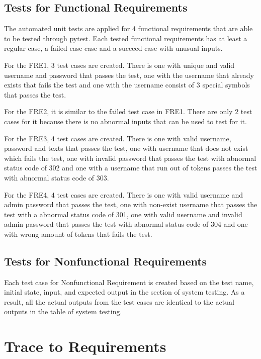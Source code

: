 \documentclass[12pt, titlepage]{article}
\begin{document}
\subsection{Tests for Functional Requirements}

    The automated unit tests are applied for 4 functional requirements that are able to be tested through pytest. Each tested functional requirements has at least a regular case, a failed case case and a succeed case with unusual inputs. 
    
    For the FRE1, 3 test cases are created. There is one with unique and valid username and password that passes the test, one with the username that already exists that fails the test and one with the username consist of 3 special symbols that passes the test.
    
    For the FRE2, it is similar to the failed test case in FRE1. There are only 2 test cases for it because there is no abnormal inputs that can be used to test for it.
    
    For the FRE3, 4 test cases are created. There is one with valid username, password and texts that passes the test, one with username that does not exist which fails the test, one with invalid password that passes the test with abnormal status code of 302 and one with a username that run out of tokens passes the test with abnormal status code of 303.
    
    For the FRE4, 4 test cases are created. There is one with valid username and admin password that passes the test, one with non-exist username that passes the test with a abnormal status code of 301, one with valid username and invalid admin password that passes the test with abnormal status code of 304 and one with wrong amount of tokens that fails the test.
    
\subsection{Tests for Nonfunctional Requirements}

    Each test case for Nonfunctional Requirement is created based on the test name, initial state, input, and expected output in the section of system testing. As a result, all the actual outputs from the test cases are identical to the actual outputs in the table of system testing.

\newpage		
\section{Trace to Requirements}
\end{document}
